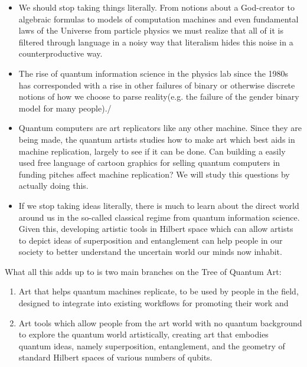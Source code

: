 \documentclass[11pt]{article}
\begin{document}
\begin{itemize}

    \item
We should stop taking things literally.  From notions about a God-creator to algebraic formulas to models of computation machines and even fundamental laws of the Universe from particle physics we must realize that all of it is filtered through language in a noisy way that literalism hides this noise in a counterproductive way.
    \item
The rise of quantum information science in the physics lab since the 1980s has corresponded with a rise in other failures of binary or otherwise discrete notions of how we choose to parse reality(e.g. the failure of the gender binary model for many people)./
    \item

        Quantum computers are art replicators like any other machine.  Since they are being made, the quantum artists studies how to make art which best aids in machine replication, largely to see if it can be done.  Can building a easily used free language of cartoon graphics for selling quantum computers in funding pitches affect machine replication?  We will study this questions by actually doing this.
    
    \item

        If we stop taking ideas literally, there is much to learn about the direct world around us in the so-called classical regime from quantum information science.  Given this, developing artistic tools in Hilbert space which can allow artists to depict ideas of superposition and entanglement can help people in our society to better understand the uncertain world our minds now inhabit.  
    
\end{itemize}


What all this adds up to is two main branches on the Tree of Quantum Art:

\begin{enumerate}

    \item

        Art that helps quantum machines replicate, to be used by people in the field, designed to integrate into existing workflows for promoting their work and
    
    \item

        Art tools which allow people from the art world with no quantum background to explore the quantum world artistically, creating art that embodies quantum ideas, namely superposition, entanglement, and the geometry of standard Hilbert spaces of various numbers of qubits. 
    
\end{enumerate}
\end{document}
